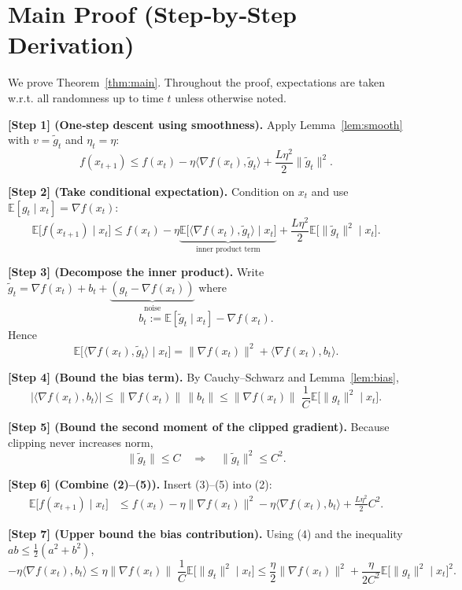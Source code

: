 \documentclass{article}
\newcommand{\E}{\mathbb{E}}
\begin{document}
\section*{Main Proof (Step‑by‑Step Derivation)}
We prove Theorem~\ref{thm:main}. Throughout the proof, expectations are taken w.r.t. all randomness up to time $t$ unless otherwise noted.

\bigskip
\noindent\textbf{[Step 1] (One‑step descent using smoothness).}  
Apply Lemma~\ref{lem:smooth} with $v=\tilde g_{t}$ and $\eta_{t}=\eta$:
\[
f(x_{t+1})\le f(x_{t})-\eta\langle\nabla f(x_{t}),\tilde g_{t}\rangle+\frac{L\eta^{2}}{2}\|\tilde g_{t}\|^{2}.
\tag{1}
\]

\noindent\textbf{[Step 2] (Take conditional expectation).}  
Condition on $x_{t}$ and use $\E[g_{t}\mid x_{t}]=\nabla f(x_{t})$:
\[
\E\!\bigl[f(x_{t+1})\mid x_{t}\bigr]
\le f(x_{t})-\eta\underbrace{\E\!\bigl[\langle\nabla f(x_{t}),\tilde g_{t}\rangle\mid x_{t}\bigr]}_{\text{inner product term}}
    +\frac{L\eta^{2}}{2}\E\!\bigl[\|\tilde g_{t}\|^{2}\mid x_{t}\bigr].
\tag{2}
\]

\noindent\textbf{[Step 3] (Decompose the inner product).}  
Write $\tilde g_{t}= \nabla f(x_{t})+b_{t}+ \underbrace{(g_{t}-\nabla f(x_{t}))}_{\text{noise}}$ where
\[
b_{t}:=\E[\tilde g_{t}\mid x_{t}]-\nabla f(x_{t}) .
\]
Hence
\[
\E\!\bigl[\langle\nabla f(x_{t}),\tilde g_{t}\rangle\mid x_{t}\bigr]
   = \|\nabla f(x_{t})\|^{2}+ \langle\nabla f(x_{t}),b_{t}\rangle .
\tag{3}
\]

\noindent\textbf{[Step 4] (Bound the bias term).}  
By Cauchy–Schwarz and Lemma~\ref{lem:bias},
\[
|\langle\nabla f(x_{t}),b_{t}\rangle|
   \le \|\nabla f(x_{t})\|\,\|b_{t}\|
   \le \|\nabla f(x_{t})\|\;\frac{1}{C}\E\!\bigl[\|g_{t}\|^{2}\mid x_{t}\bigr].
\tag{4}
\]

\noindent\textbf{[Step 5] (Bound the second moment of the clipped gradient).}  
Because clipping never increases norm,
\[
\|\tilde g_{t}\|\le C\quad\Longrightarrow\quad \|\tilde g_{t}\|^{2}\le C^{2}.
\tag{5}
\]

\noindent\textbf{[Step 6] (Combine (2)–(5)).}  
Insert (3)–(5) into (2):
\[
\begin{aligned}
\E\!\bigl[f(x_{t+1})\mid x_{t}\bigr]
&\le f(x_{t})-\eta\|\nabla f(x_{t})\|^{2}
     -\eta\langle\nabla f(x_{t}),b_{t}\rangle
     +\frac{L\eta^{2}}{2}C^{2} .
\end{aligned}
\tag{6}
\]

\noindent\textbf{[Step 7] (Upper bound the bias contribution).}  
Using (4) and the inequality $ab\le\frac{1}{2}(a^{2}+b^{2})$,
\[
-\eta\langle\nabla f(x_{t}),b_{t}\rangle
\le \eta\|\nabla f(x_{t})\|\;\frac{1}{C}\E\!\bigl[\|g_{t}\|^{2}\mid x_{t}\bigr]
\le \frac{\eta}{2}\|\nabla f(x_{t})\|^{2}
     +\frac{\eta}{2C^{2}}\E\!\bigl[\|g_{t}\|^{2}\mid x_{t}\bigr]^{2}.
\tag{7}
\]
\end{document}
